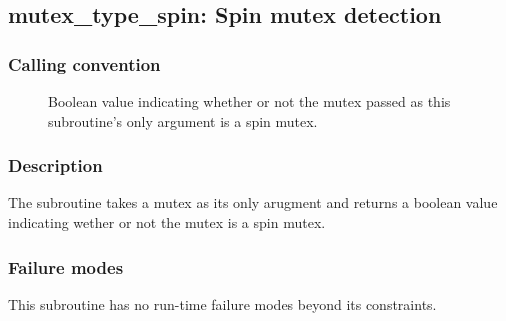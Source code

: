 \clearpage
{}
{}
\label{subr:mutex_type_spin}
\subsection*{mutex\_type\_spin: Spin mutex detection}

\subsubsection*{Calling convention}

\begin{description}
\item[] Boolean value indicating whether or not the
  mutex passed as this subroutine's only argument is a spin mutex.
\end{description}

\subsubsection*{Description}

The  subroutine takes a mutex as its only
arugment and returns a boolean value indicating wether or not the
mutex is a spin mutex.

\subsubsection*{Failure modes}

This subroutine has no run-time failure modes beyond its constraints.
